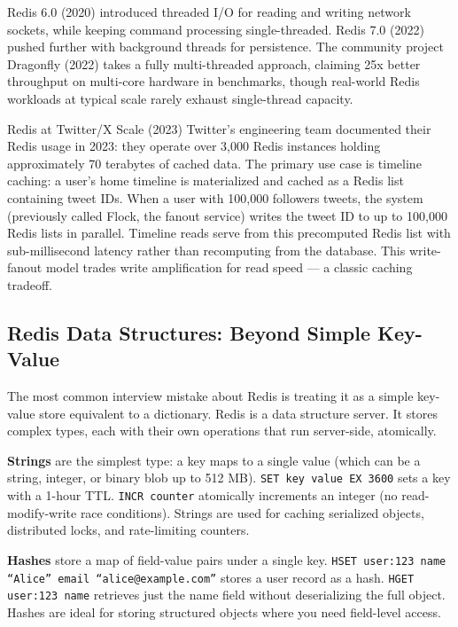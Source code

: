 \documentclass[11pt,a4paper]{article}
\begin{document}
Redis 6.0 (2020) introduced threaded I/O for reading and writing network sockets, while keeping command processing single-threaded. Redis 7.0 (2022) pushed further with background threads for persistence. The community project Dragonfly (2022) takes a fully multi-threaded approach, claiming 25x better throughput on multi-core hardware in benchmarks, though real-world Redis workloads at typical scale rarely exhaust single-thread capacity.

\begin{industrybox}{Redis at Twitter/X Scale (2023)}
Twitter's engineering team documented their Redis usage in 2023: they operate over 3,000 Redis instances holding approximately 70 terabytes of cached data. The primary use case is timeline caching: a user's home timeline is materialized and cached as a Redis list containing tweet IDs. When a user with 100,000 followers tweets, the system (previously called Flock, the fanout service) writes the tweet ID to up to 100,000 Redis lists in parallel. Timeline reads serve from this precomputed Redis list with sub-millisecond latency rather than recomputing from the database. This write-fanout model trades write amplification for read speed --- a classic caching tradeoff.
\end{industrybox}

\subsection{Redis Data Structures: Beyond Simple Key-Value}

The most common interview mistake about Redis is treating it as a simple key-value store equivalent to a dictionary. Redis is a data structure server. It stores complex types, each with their own operations that run server-side, atomically.

\textbf{Strings} are the simplest type: a key maps to a single value (which can be a string, integer, or binary blob up to 512 MB). \texttt{SET key value EX 3600} sets a key with a 1-hour TTL. \texttt{INCR counter} atomically increments an integer (no read-modify-write race conditions). Strings are used for caching serialized objects, distributed locks, and rate-limiting counters.

\textbf{Hashes} store a map of field-value pairs under a single key. \texttt{HSET user:123 name ``Alice'' email ``alice@example.com''} stores a user record as a hash. \texttt{HGET user:123 name} retrieves just the name field without deserializing the full object. Hashes are ideal for storing structured objects where you need field-level access.
\end{document}
